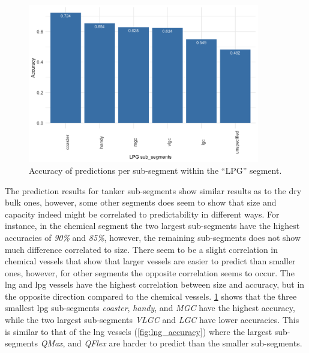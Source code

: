 \begin{figure}[htbp]
    \centering
    \includegraphics[width=0.9\textwidth]{figures/results/seg_lpg_acc}
    \caption{Accuracy of predictions per sub-segment within the ``LPG'' segment.}
    \label{fig:lpg_accuracy}
\end{figure}

The prediction results for tanker sub-segments show similar results as to the dry bulk ones, however, some other segments does seem to show that size and capacity indeed might be correlated to predictability in different ways. For instance, in the chemical segment the two largest sub-segments have the highest accuracies of \textit{90\%} and \textit{85\%}, however, the remaining sub-segments does not show much difference correlated to size. There seem to be a slight correlation in chemical vessels that show that larger vessels are easier to predict than smaller ones, however, for other segments the opposite correlation seems to occur. The \acrfull{lng} and \acrfull{lpg} vessels have the highest correlation between size and accuracy, but in the opposite direction compared to the chemical vessels. \cref{fig:lpg_accuracy} shows that the three smallest \acrshort{lpg} sub-segments \textit{coaster}, \textit{handy}, and \textit{MGC} have the highest accuracy, while the two largest sub-segments \textit{VLGC} and \textit{LGC}  have lower accuracies. This is similar to that of the \acrshort{lng} vessels (\cref{fig:lng_accuracy}) where the largest sub-segments \textit{QMax}, and \textit{QFlex} are harder to predict than the smaller sub-segments.

